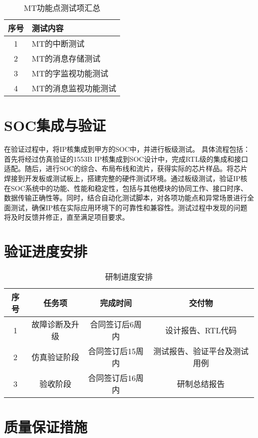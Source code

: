 \documentclass[fontset=windows]{article}
\begin{document}
\begin{table}[H]
    \centering
    \begin{tabular}{|c|p{10cm}|}
        \hline
        序号 & 测试内容 \\
        \hline
        1 & MT的中断测试 \\
        2 & MT的消息存储测试 \\
        3 & MT的字监视功能测试 \\
        4 & MT的消息监视功能测试 \\
        \hline
    \end{tabular}
    \caption{MT功能点测试项汇总}
    \label{tab:mt-feature-summary}
\end{table}

\section{SOC集成与验证}
在验证过程中，将IP核集成到甲方的SOC中，并进行板级测试。
具体流程包括：首先将经过仿真验证的1553B IP核集成到SOC设计中，完成RTL级的集成和接口适配。随后，进行SOC的综合、布局布线和流片，获得实际的芯片样品。将芯片焊接到开发板或测试板上，搭建完整的硬件测试环境。通过板级测试，验证IP核在SOC系统中的功能、性能和稳定性，包括与其他模块的协同工作、接口时序、数据传输正确性等。同时，结合自动化测试脚本，对各项功能点和异常场景进行全面测试，确保IP核在实际应用环境下的可靠性和兼容性。测试过程中发现的问题将及时反馈并修正，直至满足项目要求。

\section{验证进度安排}

\begin{table}[htbp]
    \centering
    \begin{tabular}{|c|c|c|c|}
        \hline
        序号 & 任务项 & 完成时间 & 交付物 \\
        \hline
        1 & 故障诊断及升级 & 合同签订后6周内 & 设计报告、RTL代码 \\
        \hline
        2 & 仿真验证阶段 & 合同签订后15周内 & 测试报告、验证平台及测试用例 \\
        \hline
        3 & 验收阶段 & 合同签订后16周内 & 研制总结报告 \\
        \hline
    \end{tabular}
    \caption{研制进度安排}
    \label{tab:schedule}
\end{table}

\section{质量保证措施}
\end{document}

